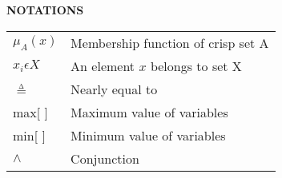 \newpage
\begin{center}
 {\large\bf NOTATIONS}
\end{center}
\begin{table}[h!]
 \begin{tabular}{p{2cm}p{8cm}}
$\mu _{A}(x)$ & Membership function of crisp set A \\
$x_{i}\epsilon X$ & An element $x$ belongs to set X \\
$\overset{\underset{\mathrm{\Delta }}{}}{=}$ & Nearly equal to \\
max[ ] & Maximum value of variables \\
min[ ] & Minimum value of variables \\
$\wedge$ & Conjunction
 \end{tabular}
 \end{table}




